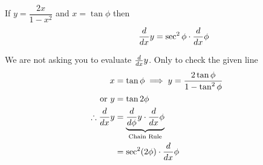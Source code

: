 \documentclass[14pt,fleqn]{extarticle}
\begin{document}
 
\begin{snippet}
    
    \incorrect
    
    If $y = \dfrac{2x}{1-x^2}$ and $x = \tan\phi$ then 
    \[ \qquad\qquad \frac{d}{dx} y = \sec^2\phi\cdot \frac{d}{dx}\phi\]
    
    \reason
    
    We are not asking you to evaluate $\frac{d}{dx}  y$. Only to check the given line
    \begin{align}
	x &= \tan\phi\implies y = \frac{2\tan\phi}{1-\tan^2\phi} \\
	\text{or } y &= \tan 2\phi \\
	\therefore \frac{d}{dx} y &= \underbrace{\frac{d}{d\phi}y\cdot \frac{d}{dx} \phi}_{\text{Chain Rule}} \\ 
	&= \sec^2 (2\phi)\cdot \frac{d}{dx}\phi 
\end{align}
\end{snippet} 
\end{document}
